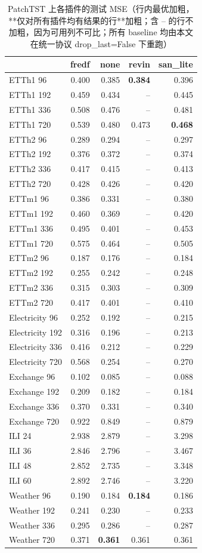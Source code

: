 \begin{table}[htbp]
\centering
\small
\caption{PatchTST 上各插件的测试 MSE（行内最优加粗，**仅对所有插件均有结果的行**加粗；含 -- 的行不加粗，因为可用列不可比；所有 baseline 均由本文在统一协议 drop\_last=False 下重跑）}
\label{tab:main_patchtst}
\begin{tabular}{lrrrr}
\toprule
 & fredf & none & revin & san\_lite \\
\midrule
ETTh1 96 & 0.400 & 0.385 & \textbf{0.384} & 0.396 \\
ETTh1 192 & 0.459 & 0.434 & -- & 0.445 \\
ETTh1 336 & 0.508 & 0.476 & -- & 0.481 \\
ETTh1 720 & 0.539 & 0.480 & 0.473 & \textbf{0.468} \\
ETTh2 96 & 0.289 & 0.294 & -- & 0.297 \\
ETTh2 192 & 0.376 & 0.372 & -- & 0.374 \\
ETTh2 336 & 0.417 & 0.415 & -- & 0.413 \\
ETTh2 720 & 0.428 & 0.426 & -- & 0.420 \\
ETTm1 96 & 0.386 & 0.331 & -- & 0.380 \\
ETTm1 192 & 0.460 & 0.369 & -- & 0.420 \\
ETTm1 336 & 0.495 & 0.401 & -- & 0.453 \\
ETTm1 720 & 0.575 & 0.464 & -- & 0.505 \\
ETTm2 96 & 0.187 & 0.176 & -- & 0.184 \\
ETTm2 192 & 0.255 & 0.242 & -- & 0.248 \\
ETTm2 336 & 0.315 & 0.303 & -- & 0.309 \\
ETTm2 720 & 0.417 & 0.401 & -- & 0.410 \\
Electricity 96 & 0.252 & 0.192 & -- & 0.215 \\
Electricity 192 & 0.316 & 0.196 & -- & 0.213 \\
Electricity 336 & 0.416 & 0.212 & -- & 0.229 \\
Electricity 720 & 0.568 & 0.254 & -- & 0.270 \\
Exchange 96 & 0.102 & 0.085 & -- & 0.088 \\
Exchange 192 & 0.209 & 0.182 & -- & 0.184 \\
Exchange 336 & 0.370 & 0.331 & -- & 0.340 \\
Exchange 720 & 0.922 & 0.849 & -- & 0.879 \\
ILI 24 & 2.938 & 2.879 & -- & 3.298 \\
ILI 36 & 2.846 & 2.796 & -- & 3.467 \\
ILI 48 & 2.852 & 2.735 & -- & 3.348 \\
ILI 60 & 2.892 & 2.746 & -- & 3.220 \\
Weather 96 & 0.190 & 0.184 & \textbf{0.184} & 0.186 \\
Weather 192 & 0.241 & 0.230 & -- & 0.233 \\
Weather 336 & 0.295 & 0.286 & -- & 0.287 \\
Weather 720 & 0.371 & \textbf{0.361} & 0.361 & 0.361 \\
\bottomrule
\end{tabular}
\end{table}
